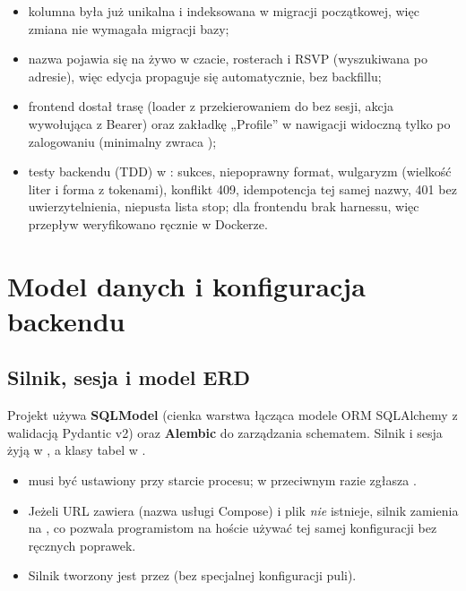 \begin{itemize}
  \item kolumna  była już unikalna i indeksowana w migracji
        początkowej, więc zmiana nie wymagała migracji bazy;
  \item nazwa pojawia się na żywo w czacie, rosterach i RSVP (wyszukiwana po adresie),
        więc edycja propaguje się automatycznie, bez backfillu;
  \item frontend dostał trasę  (loader z przekierowaniem do 
        bez sesji, akcja  wywołująca  z Bearer) oraz
        zakładkę „Profile” w nawigacji widoczną tylko po zalogowaniu (minimalny
         zwraca );
  \item testy backendu (TDD) w : sukces, niepoprawny format,
        wulgaryzm (wielkość liter i forma z tokenami), konflikt 409, idempotencja tej
        samej nazwy, 401 bez uwierzytelnienia, niepusta lista stop; dla frontendu brak
        harnessu, więc przepływ  weryfikowano ręcznie w Dockerze.
\end{itemize}

\chapter{Model danych i konfiguracja backendu}
\label{ch:dane}

\section{Silnik, sesja i model ERD}
\label{sec:dane-silnik}

Projekt używa \textbf{SQLModel} (cienka warstwa łącząca modele ORM SQLAlchemy z walidacją
Pydantic v2) oraz \textbf{Alembic} do zarządzania schematem. Silnik i sesja żyją w
, a klasy tabel w .

\begin{itemize}
  \item {} musi być ustawiony przy starcie procesu; w przeciwnym razie
         zgłasza .
  \item Jeżeli URL zawiera  (nazwa usługi Compose) i plik 
        \emph{nie} istnieje, silnik zamienia  na , co pozwala
        programistom na hoście używać tej samej konfiguracji bez ręcznych poprawek.
  \item Silnik tworzony jest przez  (bez specjalnej
        konfiguracji puli).
\end{itemize}

